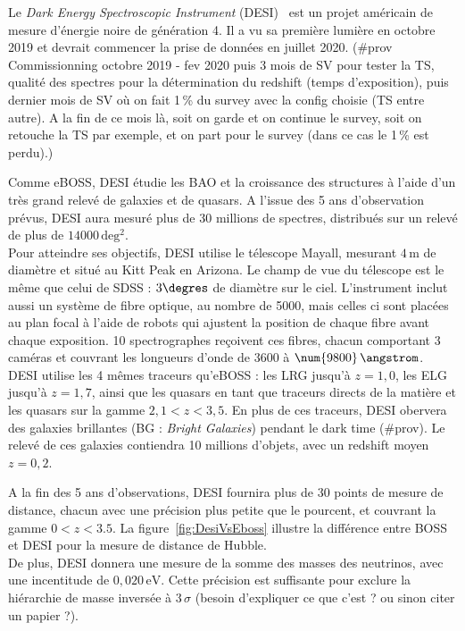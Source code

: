 \documentclass[11pt, twoside, a4paper, openright]{report}
\begin{document}
Le \emph{Dark Energy Spectroscopic Instrument} (DESI)~\cite{DESICollaboration2016} est un projet américain de mesure d'énergie noire de génération 4. Il a vu sa première lumière en octobre 2019 et devrait commencer la prise de données en juillet 2020. (\#prov Commissionning octobre 2019 - fev 2020 puis 3 mois de SV pour tester la TS, qualité des spectres pour la détermination du redshift (temps d'exposition), puis dernier mois de SV o\`u on fait 1\,\% du survey avec la config choisie (TS entre autre). A la fin de ce mois là, soit on garde et on continue le survey, soit on retouche la TS par exemple, et on part pour le survey (dans ce cas le 1\,\% est perdu).)

Comme eBOSS, DESI étudie les BAO et la croissance des structures à l'aide d'un très grand relevé de galaxies et de quasars. A l'issue des 5 ans d'observation prévus, DESI aura mesuré plus de 30 millions de spectres, distribués sur un relevé de plus de $\num{14000}\,\mathrm{deg^{2}}$. \\
Pour atteindre ses objectifs, DESI utilise le télescope Mayall, mesurant $4\,\mathrm{m}$ de diamètre et situé au Kitt Peak en Arizona. Le champ de vue du télescope est le même que celui de SDSS : $3\degres$ de diamètre sur le ciel. L'instrument inclut aussi un système de fibre optique, au nombre de \num{5000}, mais celles ci sont placées au plan focal à l'aide de robots qui ajustent la position de chaque fibre avant chaque exposition. 10 spectrographes reçoivent ces fibres, chacun comportant 3 caméras et couvrant les longueurs d'onde de \num{3600} à $\num{9800}\,\angstrom$. \\
‌‌DESI utilise les 4 mêmes traceurs qu'eBOSS : les LRG jusqu'à $z=1,0$, les ELG jusqu'à $z=1,7$, ainsi que les quasars en tant que traceurs directs de la matière et les quasars \lya sur la gamme $2,1 < z < 3,5$. En plus de ces traceurs, DESI obervera des galaxies brillantes (BG : \emph{Bright Galaxies}) pendant le dark time (\#prov). Le relevé de ces galaxies contiendra 10 millions d'objets, avec un redshift moyen $z=0,2$.

A la fin des 5 ans d'observations, DESI fournira plus de 30 points de mesure de distance, chacun avec une précision plus petite que le pourcent, et couvrant la gamme $0 < z < 3.5$. La figure~\ref{fig:DesiVsEboss} illustre la différence entre BOSS et DESI pour la mesure de distance de Hubble.\\
De plus, DESI donnera une mesure de la somme des masses des neutrinos, avec une incentitude de $0,020\,\mathrm{eV}$. Cette précision est suffisante pour exclure la hiérarchie de masse inversée à $3\,\sigma$ (besoin d'expliquer ce que c'est ? ou sinon citer un papier ?).
\end{document}
